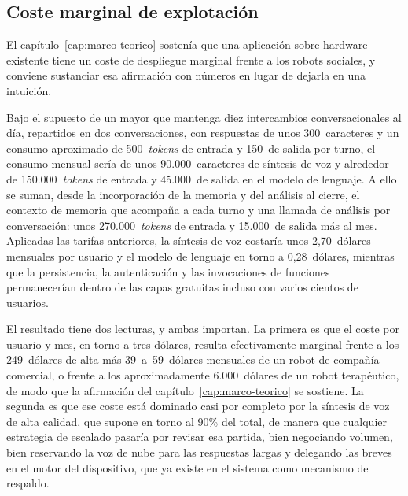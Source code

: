 \subsection{Coste marginal de explotación}

El capítulo~\ref{cap:marco-teorico} sostenía que una aplicación sobre hardware existente tiene un coste de
despliegue marginal frente a los robots sociales, y conviene sustanciar esa afirmación con números en lugar
de dejarla en una intuición.

Bajo el supuesto de un mayor que mantenga diez intercambios conversacionales al día, repartidos en dos
conversaciones, con respuestas de unos 300~caracteres y un consumo aproximado de 500~\textit{tokens} de
entrada y 150~de salida por turno, el consumo mensual sería de unos 90.000~caracteres de síntesis de voz y
alrededor de 150.000~\textit{tokens} de entrada y 45.000~de salida en el modelo de lenguaje. A ello se
suman, desde la incorporación de la memoria y del análisis al cierre, el contexto de memoria que acompaña a
cada turno y una llamada de análisis por conversación: unos 270.000~\textit{tokens} de entrada y 15.000~de
salida más al mes. Aplicadas las tarifas anteriores, la síntesis de voz costaría unos 2,70~dólares mensuales
por usuario y el modelo de lenguaje en torno a 0,28~dólares, mientras que la persistencia, la autenticación
y las invocaciones de funciones permanecerían dentro de las capas gratuitas incluso con varios cientos de
usuarios.

El resultado tiene dos lecturas, y ambas importan. La primera es que el coste por usuario y mes, en torno a
tres dólares, resulta efectivamente marginal frente a los 249~dólares de alta más 39~a~59~dólares mensuales
de un robot de compañía comercial, o frente a los aproximadamente 6.000~dólares de un robot terapéutico, de
modo que la afirmación del capítulo~\ref{cap:marco-teorico} se sostiene. La segunda es que ese coste está
dominado casi por completo por la síntesis de voz de alta calidad, que supone en torno al 90\% del total, de
manera que cualquier estrategia de escalado pasaría por revisar esa partida, bien negociando volumen, bien
reservando la voz de nube para las respuestas largas y delegando las breves en el motor del dispositivo, que
ya existe en el sistema como mecanismo de respaldo.
